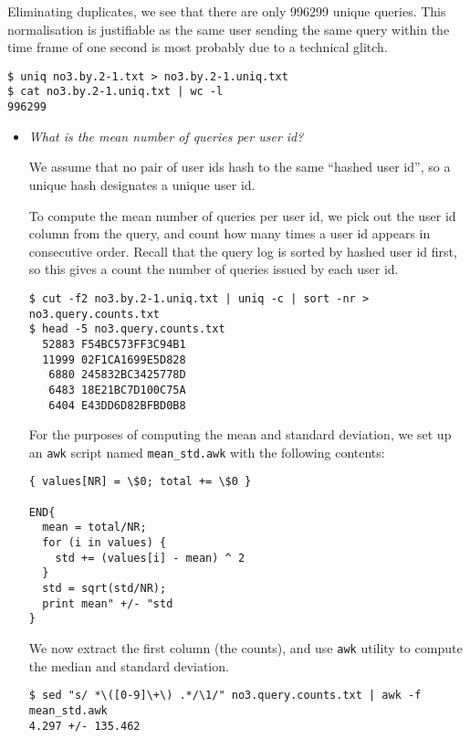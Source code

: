 Eliminating duplicates, we see that there are only 996299 unique queries. This
normalisation is justifiable as the same user sending the same query within the
time frame of one second is most probably due to a technical glitch.

\begin{lstlisting}
$ uniq no3.by.2-1.txt > no3.by.2-1.uniq.txt
$ cat no3.by.2-1.uniq.txt | wc -l
996299
\end{lstlisting}

\begin{itemize}

\item \emph{What is the mean number of queries per user id?}

We assume that no pair of user ids hash to the same ``hashed user id'',
so a unique hash designates a unique user id.

To compute the mean number of queries per user id, we pick out the user id
column from the query, and count how many times a user id appears in
consecutive order. Recall that the query log is sorted by hashed user id first,
so this gives a count the number of queries issued by each user id.

\begin{lstlisting}
$ cut -f2 no3.by.2-1.uniq.txt | uniq -c | sort -nr > no3.query.counts.txt
$ head -5 no3.query.counts.txt 
  52883 F54BC573FF3C94B1
  11999 02F1CA1699E5D828
   6880 245832BC3425778D
   6483 18E21BC7D100C75A
   6404 E43DD6D82BFBD0B8
\end{lstlisting}

For the purposes of computing the mean and standard deviation, we set up an
\texttt{awk} script named \texttt{mean\_std.awk} with the following contents:

\begin{lstlisting}
{ values[NR] = \$0; total += \$0 }

END{
  mean = total/NR;
  for (i in values) {
    std += (values[i] - mean) ^ 2
  }
  std = sqrt(std/NR);
  print mean" +/- "std
}
\end{lstlisting}

We now extract the first column (the counts), and use \texttt{awk} utility to
compute the median and standard deviation.

\begin{lstlisting}
$ sed "s/ *\([0-9]\+\) .*/\1/" no3.query.counts.txt | awk -f mean_std.awk
4.297 +/- 135.462
\end{lstlisting}


\end{itemize}
